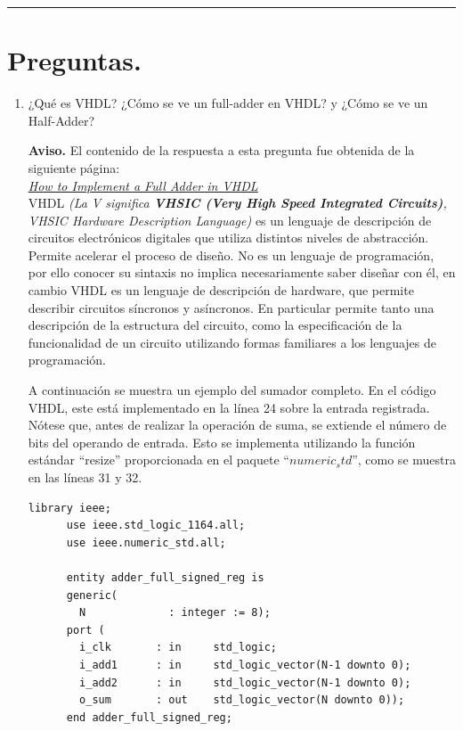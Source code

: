 \documentclass[12pt,letterpaper]{article}
\begin{document}
\bigskip
\hrule height 0.1pt
\bigskip

\section*{Preguntas.}

\begin{enumerate}
\item ¿Qu\'{e} es VHDL? ¿C\'{o}mo se ve un full-adder en VHDL? y ¿C\'{o}mo se ve un Half-Adder?
  
    \bigskip
    \textbf{Aviso.} El contenido de la respuesta a esta pregunta fue obtenida de la siguiente p\'{a}gina:\\
    \href{https://surf-vhdl.com/how-to-implement-a-full-adder-in-vhdl/}{\textit{\uline{How to Implement a Full Adder in VHDL}}}\\
    VHDL \textit{(La V significa \textbf{VHSIC (Very High Speed Integrated Circuits)}, VHSIC Hardware Description Language)} es un lenguaje de descripción de circuitos electrónicos digitales que utiliza distintos niveles de abstracción.
    Permite acelerar el proceso de diseño.
    No es un lenguaje de programación, por ello conocer su sintaxis no implica necesariamente saber diseñar con él, en cambio VHDL es un lenguaje de descripción de hardware, que permite describir circuitos síncronos y asíncronos. En particular permite tanto una descripción de la estructura del circuito, como la especificación de la funcionalidad de un circuito utilizando formas familiares a los lenguajes de programación.
   
    A continuaci\'{o}n se muestra un ejemplo del sumador completo. En el código VHDL, este está implementado en la línea 24 sobre la entrada registrada. N\'{o}tese que, antes de realizar la operación de suma, se extiende el número de bits del operando de entrada. Esto se implementa utilizando la función estándar “resize” proporcionada en el paquete $“numeric_std”$, como se muestra en las líneas 31 y 32.\\

    \begin{lstlisting}[style=vhdlstyle, caption={Código VHDL - Sumador con Registro}]
      library ieee;
      use ieee.std_logic_1164.all;
      use ieee.numeric_std.all;

      entity adder_full_signed_reg is
      generic(
        N             : integer := 8);
      port (
        i_clk       : in     std_logic;
        i_add1      : in     std_logic_vector(N-1 downto 0);
        i_add2      : in     std_logic_vector(N-1 downto 0);
        o_sum       : out    std_logic_vector(N downto 0));
      end adder_full_signed_reg;
        

\end{lstlisting}
\end{enumerate}
\end{document}
